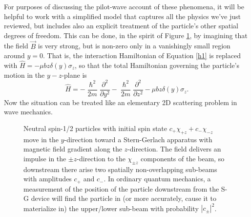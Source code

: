\documentclass[aps,prc,onecolumn,letterpaper,floatfix,12pt]{revtex4}
\renewcommand{\hbar}{\hslash}
\begin{document}
For purposes of discussing the pilot-wave account of these phenomena,
it will be helpful to work with a simplified model that captures all
the physics we've just reviewed, but includes also an explicit
treatment of the particle's other spatial degrees of freedom.  This
can be done, in the spirit of Figure \ref{fig1}, by imagining that the
field $\vec{B}$ is very strong, but is non-zero only in a vanishingly
small region around $y=0$.  That is, the interaction Hamiltonian of
Equation \eqref{h1} is replaced with $\hat{H} = - \mu b z \delta(y)
\sigma_z$, so that the total Hamiltonian governing the particle's
motion in the $y-z$-plane is
\begin{equation}
\hat{H} = -\frac{\hbar^2}{2m} \frac{\partial^2}{\partial y^2} -
\frac{\hbar^2}{2m} \frac{\partial^2}{\partial z^2} - \mu b z \delta(y)
\sigma_z.
\end{equation}
Now the situation can be treated like an elementary 2D scattering
problem in wave mechanics.  


\begin{figure}[t]
\begin{center}
\scalebox{.85}{

}
\caption{Neutral spin-1/2 particles with initial spin state $c_+
  \chi_{+z} + c_- \chi_{-z}$ move in the $y$-direction toward a
  Stern-Gerlach apparatus with magnetic field gradient along the
  $z$-direction.  The field delivers an impulse in the
  $\pm z$-direction to the $\chi_{\pm z}$ components of the beam, so
  downstream there arise two spatially non-overlapping sub-beams 
with amplitudes $c_+$ and $c_-$.  In ordinary quantum mechanics,
a measurement of the position of the particle downstream from the S-G
device will find the particle in (or more accurately, cause it to
materialize in) the upper/lower sub-beam with probability
$|c_\pm|^2$. 
\label{fig1}
}
\end{center}
\end{figure}
\end{document}
